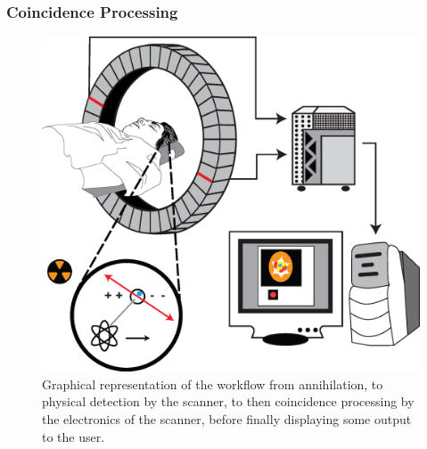             \subsubsection{Coincidence Processing} \label{sec:coincidence_processing}
                
                \begin{figure}
                    \centering
                    
                    \includegraphics[width=1.0\linewidth]{figures/background_coincidence_processing.png}
                    
                    \captionsetup{singlelinecheck=false}
                    \caption{
                        Graphical representation of the workflow from annihilation, to physical detection by the scanner, to then coincidence processing by the electronics of the scanner, before finally displaying some output to the user.
                    }
                    \label{fig:coincidence_processing_coincidence_processing}
                \end{figure}

